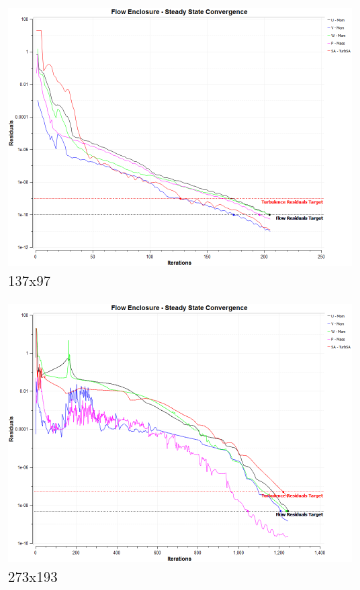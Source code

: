 \begin{figure}[ht!]
\begin{subfigure}{0.48\textwidth}
        \includegraphics[width=\textwidth]{./figs/flatnx/137x97_conv.png}
        \caption{137x97}
    \end{subfigure}
    \hfill
    \begin{subfigure}{0.48\textwidth}
        \includegraphics[width=\textwidth]{./figs/flatnx/273x193_conv.png}
        \caption{273x193}
    \end{subfigure}
    \\
    \begin{subfigure}{0.48\textwidth}

\end{subfigure}
\end{figure}
